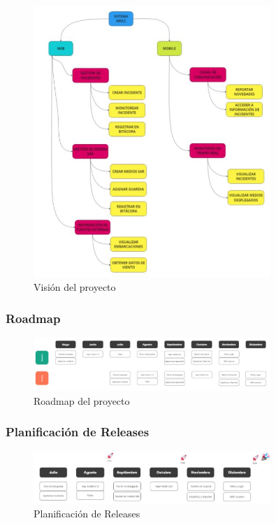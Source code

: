 \begin{figure}[H]
    \centering
    \includegraphics[width=0.8\textwidth]{../imagenes/secciones/6-Gestion-del-proyecto/vision.jpg}
    \caption{Visión del proyecto}
    \label{fig:vision}
\end{figure}

\subsubsection{Roadmap}

\begin{figure}[H]
    \centering
    \includegraphics[width=0.8\textwidth]{../imagenes/secciones/6-Gestion-del-proyecto/roadmap.jpg}
    \caption{Roadmap del proyecto}
    \label{fig:roadmap}
\end{figure}

\subsubsection{Planificación de Releases}

\begin{figure}[H]
    \centering
    \includegraphics[width=0.8\textwidth]{../imagenes/secciones/6-Gestion-del-proyecto/releases.jpg}
    \caption{Planificación de Releases}
    \label{fig:releases}
\end{figure}

